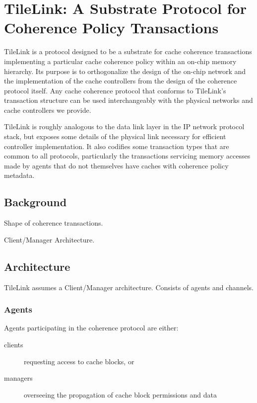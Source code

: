 \chapter{TileLink: A Substrate Protocol for Coherence Policy Transactions }
\label{c.tilelink}

TileLink is a protocol designed to be a substrate for cache coherence transactions implementing a particular cache coherence policy within an on-chip memory hierarchy.
Its purpose is to orthogonalize the design of the on-chip network and the implementation of the cache controllers from the design of the coherence protocol itself.
Any cache coherence protocol that conforms to TileLink's transaction structure can be used interchangeably with the physical networks and cache controllers we provide.

TileLink is roughly analogous to the data link layer in the IP network protocol stack, but exposes some details of the physical link necessary for efficient controller implementation.
It also codifies some transaction types that are common to all protocols, particularly the transactions servicing memory accesses made by agents that do not themselves have caches with coherence policy metadata.

\section{Background}

Shape of coherence transactions.

Client/Manager Architecture.


\section{Architecture}
\label{s.arch}

TileLink assumes a Client/Manager architecture.
Consists of agents and channels.

\subsection{Agents}

Agents participating in the coherence protocol are either:
\begin{description}
\item[clients] requesting access to cache blocks, or
\item[managers] overseeing the propagation of cache block permissions and data
\end{description}

